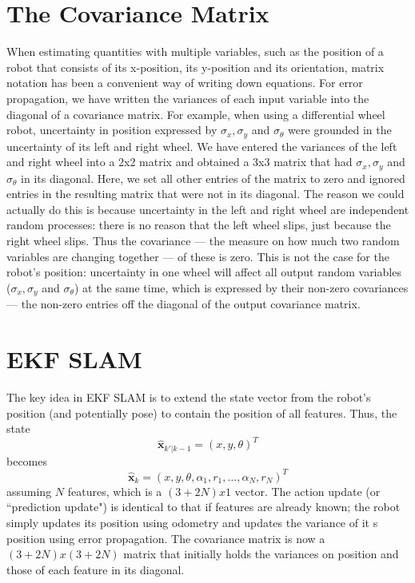 \section{The Covariance Matrix}
When estimating quantities with multiple variables, such as the position of a robot that consists of its x-position, its y-position and its orientation, matrix notation has been a convenient way of writing down equations. For error propagation, we have written the variances of each input variable into the diagonal of a covariance matrix. For example, when using a differential wheel robot, uncertainty in position expressed by $ \sigma_x, \sigma_y$ and $ \sigma_{\theta}$ were grounded in the uncertainty of its left and right wheel. We have entered the variances of the left and right wheel into a 2x2 matrix and obtained a 3x3 matrix that had $ \sigma_x, \sigma_y$ and $ \sigma_{\theta}$ in its diagonal. Here, we set all other entries of the matrix to zero and ignored entries in the resulting matrix that were not in its diagonal. The reason we could actually do this is because uncertainty in the left and right wheel are independent random processes: there is no reason that the left wheel slips, just because the right wheel slips.  Thus the covariance --- the measure on how much two random variables are changing together --- of these is zero. This is not the case for the robot's position: uncertainty in one wheel will affect all output random variables ($ \sigma_x, \sigma_y$ and $ \sigma_{\theta}$) at the same time, which is expressed by their non-zero covariances --- the non-zero entries off the diagonal of the output covariance matrix.

\section{EKF SLAM}\label{sec:ekfslam}\label{sec:ekf}
The key idea in EKF SLAM is to extend the state vector from the robot's position (and potentially pose) to contain the position of all features. Thus, the state
\begin{equation}
\hat{\boldsymbol{x}}_{k'|k-1}=(x,y,\theta)^T
\end{equation}
becomes
\begin{equation}
\hat{\boldsymbol{x}}_{k}=(x,y,\theta,\alpha_1,r_1,\ldots,\alpha_N,r_N)^T
\end{equation}
assuming $ N$ features, which is a $(3+2N) x1$ vector. The action update (or ``prediction update") is identical to that if features are already known; the robot simply updates its position using odometry and updates the variance of it s position using error propagation. The covariance matrix is now a $(3+2N)x(3+2N)$ matrix that initially holds the variances on position and those of each feature in its diagonal.

